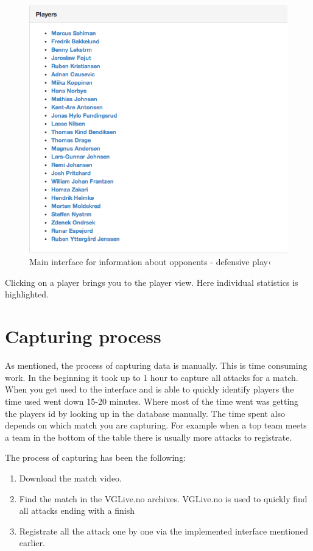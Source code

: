 \begin{figure}[ht!]
\centering
\includegraphics[width=1\textwidth]{images/general/team_analysis3.png}
\caption{Main interface for information about opponents - defensive play‹}
\label{fig:team_analysis2}
\end{figure}

Clicking on a player brings you to the player view. Here individual statistics is highlighted. 

\section{Capturing process}

As mentioned, the process of capturing data is manually. This is time consuming work. In the beginning it took up to 1 hour to capture all attacks for a match. When you get used to the interface and is able to quickly identify players the time used went down 15-20 minutes. Where most of the time went was getting the players id by looking up in the database manually. The time spent also depends on which match you are capturing. For example when a top team meets a team in the bottom of the table there is usually more attacks to registrate. 

The process of capturing has been the following:
\begin{enumerate}
  \item Download the match video.
  \item Find the match in the VGLive.no archives. VGLive.no is used to quickly find all attacks ending with a finish
  \item Registrate all the attack one by one via the implemented interface mentioned earlier.
\end{enumerate}